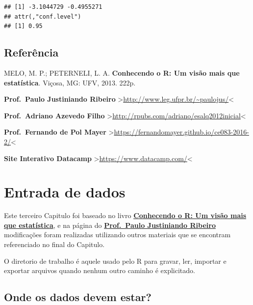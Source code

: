 \documentclass[
]{book}
\newenvironment{Shaded}{\begin{snugshade}}{\end{snugshade}}
\newcommand{\CommentTok}[1]{\textcolor[rgb]{0.56,0.35,0.01}{\textit{#1}}}
\newcommand{\NormalTok}[1]{#1}
\newcommand{\OperatorTok}[1]{\textcolor[rgb]{0.81,0.36,0.00}{\textbf{#1}}}
\begin{document}
\begin{Shaded}
\end{Shaded}

\begin{verbatim}
## [1] -3.1044729 -0.4955271
## attr(,"conf.level")
## [1] 0.95
\end{verbatim}

\hypertarget{referuxeancia-1}{%
\section{Referência}\label{referuxeancia-1}}

MELO, M. P.; PETERNELI, L. A. \textbf{Conhecendo o R: Um visão mais que estatística}. Viçosa, MG: UFV, 2013. 222p.

\textbf{Prof.~Paulo Justiniando Ribeiro} \textgreater{}\url{http://www.leg.ufpr.br/~paulojus/}\textless{}

\textbf{Prof.~Adriano Azevedo Filho} \textgreater{}\url{http://rpubs.com/adriano/esalq2012inicial}\textless{}

\textbf{Prof.~Fernando de Pol Mayer} \textgreater{}\url{https://fernandomayer.github.io/ce083-2016-2/}\textless{}

\textbf{Site Interativo Datacamp} \textgreater{}\url{https://www.datacamp.com/}\textless{}

\hypertarget{entrada-de-dados}{%
\chapter{Entrada de dados}\label{entrada-de-dados}}

Este terceiro Capitulo foi baseado no livro \href{https://www.editoraufv.com.br/produto/conhecendo-o-r-uma-visao-mais-que-estatistica/1109294}{\textbf{Conhecendo o R: Um visão mais que estatística}}, e na página do \href{http://www.leg.ufpr.br/~paulojus/}{\textbf{Prof.~Paulo Justiniando Ribeiro}} modificações foram realizadas utilizando outros materiais que se encontram referenciado no final do Capitulo.

O diretorio de trabalho é aquele usado pelo R para gravar, ler, importar e exportar arquivos quando nenhum outro caminho é explicitado.

\hypertarget{onde-os-dados-devem-estar}{%
\section{Onde os dados devem estar?}\label{onde-os-dados-devem-estar}}
\end{document}

